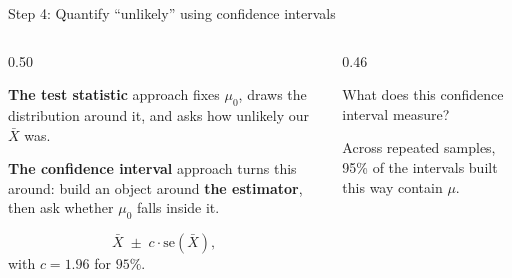 \documentclass[9pt,english,aspectratio=169]{beamer}
\newcommand{\se}{\text{se}}
\begin{document}
%

\begin{frame}[label=ci-intervals]{Step 4: Quantify ``unlikely'' using confidence intervals}

  \begin{columns}[T]
    \begin{column}{0.50\textwidth}
      \vspace{0.2em}
      \begin{methodbox}
        \textbf{The test statistic} approach fixes $\mu_0$, draws the distribution around it, and asks how unlikely our $\bar{X}$ was.
      \end{methodbox}
      \pause

      \vspace{0.4em}
      \begin{methodbox}
        \textbf{The confidence interval} approach turns this around: build an object around
        \textbf{the estimator}, then ask whether $\mu_0$ falls inside it.
      \end{methodbox}
      \pause

      \vspace{0.4em}
      \begin{definitionbox}
        \[
          \bar{X} \;\pm\; c \cdot \se\!\left(\bar{X}\right),
        \]
        with $c = 1.96$ for $95\%$. 
      \end{definitionbox}
    \end{column}
    \begin{column}{0.46\textwidth}
      \vspace{0.2em}
      \pause
      \begin{questionbox}
        What does this confidence interval measure?
      \end{questionbox}
      \pause

      \vspace{0.5em}
      \begin{answerbox}
        Across repeated samples, 95\% of the intervals built this way contain $\mu$.
      \end{answerbox}
      
    \end{column}
  \end{columns}

\end{frame}
\end{document}
